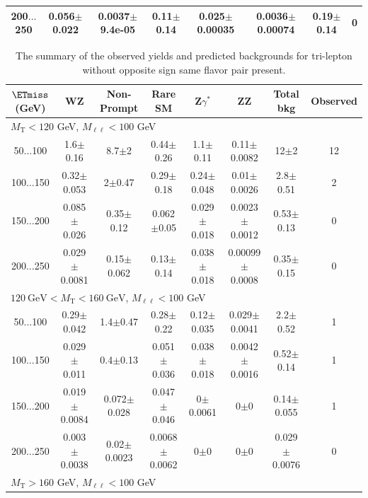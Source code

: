 \begin{landscape}
\begin{table}
\begin{center}
\begin{tabular}{| c | c c c c c c c | }
200$\dots$250&0.056$\pm$0.022&0.0037$\pm$9.4e-05&0.11$\pm$0.14&0.025$\pm$0.00035&0.0036$\pm$0.00074&0.19$\pm$0.14&0\\
\hline\hline
\end{tabular}
\end{center}
\end{table}
\begin{table}
\small
\begin{center}
\caption{\label{tab:OSSF0tau0} The summary of the observed yields and predicted backgrounds for tri-lepton 
without opposite sign same flavor pair present. }
\begin{tabular}{| c | c c c c c c c | }\hline\hline
$\ETmiss$ (GeV) & WZ & Non-Prompt & Rare SM & Z$\gamma^*$ & ZZ & Total bkg & Observed\\\hline\hline
\multicolumn{8}{l}{$M_{\text{T}} < 120$ GeV, $M_{\ell\ell} < 100$ GeV}\\\hline\hline
50$\dots$100&1.6$\pm$0.16&8.7$\pm$2&0.44$\pm$0.26&1.1$\pm$0.11&0.11$\pm$0.0082&12$\pm$2&12\\
100$\dots$150&0.32$\pm$0.053&2$\pm$0.47&0.29$\pm$0.18&0.24$\pm$0.048&0.01$\pm$0.0026&2.8$\pm$0.51&2\\
150$\dots$200&0.085$\pm$0.026&0.35$\pm$0.12&0.062$\pm$0.05&0.029$\pm$0.018&0.0023$\pm$0.0012&0.53$\pm$0.13&0\\
200$\dots$250&0.029$\pm$0.0081&0.15$\pm$0.062&0.13$\pm$0.14&0.038$\pm$0.018&0.00099$\pm$0.0008&0.35$\pm$0.15&0\\
\hline\hline
\multicolumn{8}{l}{$120~\mathrm{GeV} < M_{\text{T}} < 160~\mathrm{GeV}$, $M_{\ell\ell} < 100$ GeV}\\\hline\hline
50$\dots$100&0.29$\pm$0.042&1.4$\pm$0.47&0.28$\pm$0.22&0.12$\pm$0.035&0.029$\pm$0.0041&2.2$\pm$0.52&1\\
100$\dots$150&0.029$\pm$0.011&0.4$\pm$0.13&0.051$\pm$0.036&0.038$\pm$0.018&0.0042$\pm$0.0016&0.52$\pm$0.14&1\\
150$\dots$200&0.019$\pm$0.0084&0.072$\pm$0.028&0.047$\pm$0.046&0$\pm$0.0061&0$\pm$0&0.14$\pm$0.055&1\\
200$\dots$250&0.003$\pm$0.0038&0.02$\pm$0.0023&0.0068$\pm$0.0062&0$\pm$0&0$\pm$0&0.029$\pm$0.0076&0\\
\hline\hline
\multicolumn{8}{l}{$M_{\text{T}} > 160$ GeV, $M_{\ell\ell} < 100$ GeV}\\\hline\hline

\end{tabular}
\end{center}
\end{table}
\end{landscape}
